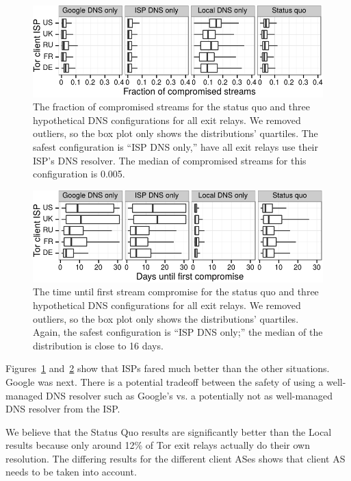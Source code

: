 \begin{figure}[t]
\centering
\includegraphics[width=0.75\linewidth]{figures/differences-comp-streams.pdf}
\caption{The fraction of compromised streams for the status quo and three
hypothetical DNS configurations for all exit relays.  We removed outliers, so
the box plot only shows the distributions' quartiles.  The safest configuration
is ``ISP DNS only,'' \ie have all exit relays use their ISP's DNS resolver.  The
median of compromised streams for this configuration is 0.005.}
\label{fig:compromised-streams}
\end{figure}

\begin{figure}[t]
\centering
\includegraphics[width=0.75\linewidth]{figures/differences-time-comp.pdf}
\caption{The time until first stream compromise for the status quo and three
hypothetical DNS configurations for all exit relays.  We removed outliers, so
the box plot only shows the distributions' quartiles.  Again, the safest
configuration is ``ISP DNS only;'' the median of the distribution is
close to 16 days.}
\label{fig:time-until-compromise}
\end{figure}

Figures~\ref{fig:compromised-streams}
and~\ref{fig:time-until-compromise} show that
ISPs fared much better than the other situations. Google was next. There is a potential 
tradeoff between the safety of using a well-managed DNS resolver such as Google's vs. 
a potentially not as well-managed DNS resolver from the ISP.  

We believe that the Status Quo results are significantly better than the 
Local results because only around 12\% of Tor exit relays actually do their own resolution.
The differing results for the different client ASes shows that client AS needs to be 
taken into account. 

